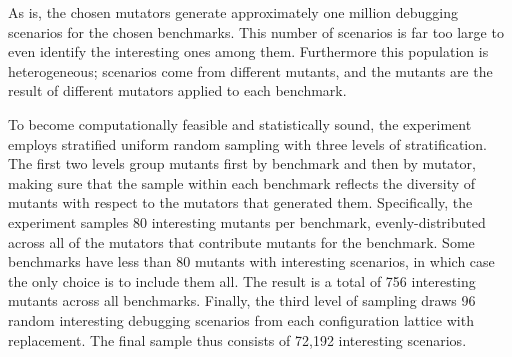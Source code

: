 

As is, the chosen mutators generate approximately one million debugging
scenarios for the chosen benchmarks. This number of scenarios is far too large
to even identify the interesting ones among them.  Furthermore this population
is heterogeneous; scenarios come from different mutants, and the mutants are the
result of different mutators applied to each benchmark.

To become computationally feasible and statistically sound, the experiment employs
stratified uniform random sampling with three levels of stratification.
The first two levels group mutants first by benchmark and then by
mutator, making sure that the sample within each benchmark reflects the diversity of
mutants with respect to the mutators that generated them.  Specifically, the
experiment samples 80 interesting mutants per benchmark,
evenly-distributed across all of the mutators that contribute mutants for the
benchmark. Some benchmarks have less than  80 mutants with interesting scenarios,
in which case the only choice is to include them all.
The result is a total of 756 interesting mutants across all benchmarks.
Finally, the third level of sampling draws 96 random interesting debugging
scenarios from each configuration lattice with replacement. The
final sample thus consists of 72,192 interesting scenarios.





